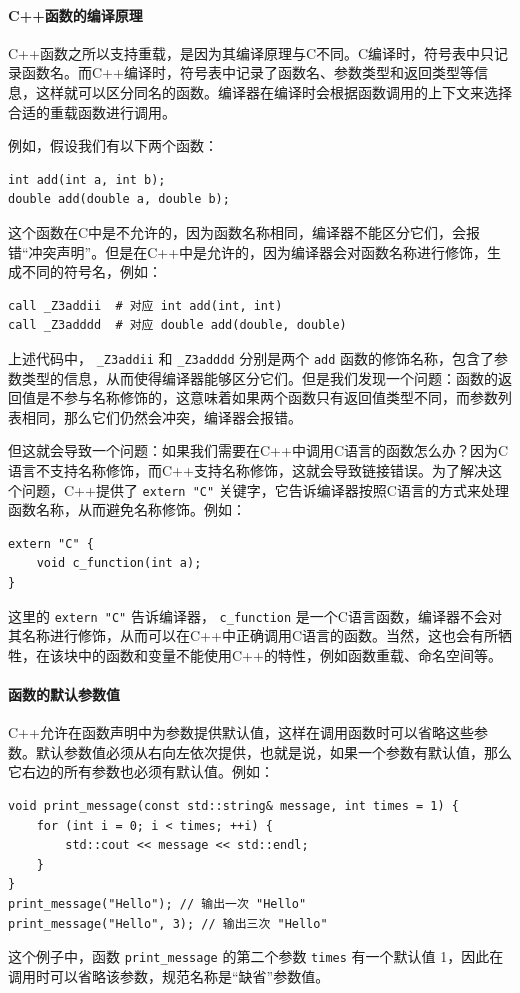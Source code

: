 \paragraph{C++函数的编译原理}

C++函数之所以支持重载，是因为其编译原理与C不同。C编译时，符号表中只记录函数名。而C++编译时，符号表中记录了函数名、参数类型和返回类型等信息，这样就可以区分同名的函数。编译器在编译时会根据函数调用的上下文来选择合适的重载函数进行调用。

例如，假设我们有以下两个函数：
\begin{verbatim}
int add(int a, int b);
double add(double a, double b);
\end{verbatim}
这个函数在C中是不允许的，因为函数名称相同，编译器不能区分它们，会报错“冲突声明”。但是在C++中是允许的，因为编译器会对函数名称进行修饰，生成不同的符号名，例如：
\begin{verbatim}
call _Z3addii  # 对应 int add(int, int)
call _Z3adddd  # 对应 double add(double, double)
\end{verbatim}
上述代码中， \verb|_Z3addii| 和 \verb|_Z3adddd| 分别是两个 \verb|add| 函数的修饰名称，包含了参数类型的信息，从而使得编译器能够区分它们。但是我们发现一个问题：函数的返回值是不参与名称修饰的，这意味着如果两个函数只有返回值类型不同，而参数列表相同，那么它们仍然会冲突，编译器会报错。

但这就会导致一个问题：如果我们需要在C++中调用C语言的函数怎么办？因为C语言不支持名称修饰，而C++支持名称修饰，这就会导致链接错误。为了解决这个问题，C++提供了 \verb|extern "C"| 关键字，它告诉编译器按照C语言的方式来处理函数名称，从而避免名称修饰。例如：
\begin{verbatim}
extern "C" {
    void c_function(int a);
}
\end{verbatim}
这里的 \verb|extern "C"| 告诉编译器， \verb|c_function| 是一个C语言函数，编译器不会对其名称进行修饰，从而可以在C++中正确调用C语言的函数。当然，这也会有所牺牲，在该块中的函数和变量不能使用C++的特性，例如函数重载、命名空间等。

\paragraph{函数的默认参数值}

C++允许在函数声明中为参数提供默认值，这样在调用函数时可以省略这些参数。默认参数值必须从右向左依次提供，也就是说，如果一个参数有默认值，那么它右边的所有参数也必须有默认值。例如：
\begin{verbatim}
void print_message(const std::string& message, int times = 1) {
    for (int i = 0; i < times; ++i) {
        std::cout << message << std::endl;
    }
}
print_message("Hello"); // 输出一次 "Hello"
print_message("Hello", 3); // 输出三次 "Hello"
\end{verbatim}
这个例子中，函数 \verb|print_message| 的第二个参数 \verb|times| 有一个默认值 1，因此在调用时可以省略该参数，规范名称是“缺省”参数值。

